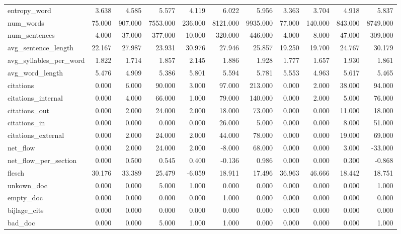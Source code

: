 \begin{tabular}{lrrrrrrrrrr}
\cline{1-11}
entropy\_word & 3.638 & 4.585 & 5.577 & 4.119 & 6.022 & 5.956 & 3.363 & 3.704 & 4.918 & 5.837 \\
\cline{1-11}
num\_words & 75.000 & 907.000 & 7553.000 & 236.000 & 8121.000 & 9935.000 & 77.000 & 140.000 & 843.000 & 8749.000 \\
\cline{1-11}
num\_sentences & 4.000 & 37.000 & 377.000 & 10.000 & 320.000 & 446.000 & 4.000 & 8.000 & 47.000 & 309.000 \\
\cline{1-11}
avg\_sentence\_length & 22.167 & 27.987 & 23.931 & 30.976 & 27.946 & 25.857 & 19.250 & 19.700 & 24.767 & 30.179 \\
\cline{1-11}
avg\_syllables\_per\_word & 1.822 & 1.714 & 1.857 & 2.145 & 1.886 & 1.928 & 1.777 & 1.657 & 1.930 & 1.861 \\
\cline{1-11}
avg\_word\_length & 5.476 & 4.909 & 5.386 & 5.801 & 5.594 & 5.781 & 5.553 & 4.963 & 5.617 & 5.465 \\
\cline{1-11}
citations & 0.000 & 6.000 & 90.000 & 3.000 & 97.000 & 213.000 & 0.000 & 2.000 & 38.000 & 94.000 \\
\cline{1-11}
citations\_internal & 0.000 & 4.000 & 66.000 & 1.000 & 79.000 & 140.000 & 0.000 & 2.000 & 5.000 & 76.000 \\
\cline{1-11}
citations\_out & 0.000 & 2.000 & 24.000 & 2.000 & 18.000 & 73.000 & 0.000 & 0.000 & 11.000 & 18.000 \\
\cline{1-11}
citations\_in & 0.000 & 0.000 & 0.000 & 0.000 & 26.000 & 5.000 & 0.000 & 0.000 & 8.000 & 51.000 \\
\cline{1-11}
citations\_external & 0.000 & 2.000 & 24.000 & 2.000 & 44.000 & 78.000 & 0.000 & 0.000 & 19.000 & 69.000 \\
\cline{1-11}
net\_flow & 0.000 & 2.000 & 24.000 & 2.000 & -8.000 & 68.000 & 0.000 & 0.000 & 3.000 & -33.000 \\
\cline{1-11}
net\_flow\_per\_section & 0.000 & 0.500 & 0.545 & 0.400 & -0.136 & 0.986 & 0.000 & 0.000 & 0.300 & -0.868 \\
\cline{1-11}
flesch & 30.176 & 33.389 & 25.479 & -6.059 & 18.911 & 17.496 & 36.963 & 46.666 & 18.442 & 18.751 \\
\cline{1-11}
unkown\_doc & 0.000 & 0.000 & 5.000 & 1.000 & 0.000 & 0.000 & 0.000 & 0.000 & 0.000 & 1.000 \\
\cline{1-11}
empty\_doc & 0.000 & 0.000 & 0.000 & 0.000 & 1.000 & 0.000 & 0.000 & 0.000 & 0.000 & 0.000 \\
\cline{1-11}
bijlage\_cits & 0.000 & 0.000 & 0.000 & 0.000 & 0.000 & 0.000 & 0.000 & 0.000 & 0.000 & 0.000 \\
\cline{1-11}
bad\_doc & 0.000 & 0.000 & 5.000 & 1.000 & 1.000 & 0.000 & 0.000 & 0.000 & 0.000 & 1.000 \\
\cline{1-11}
\bottomrule
\end{tabular}
